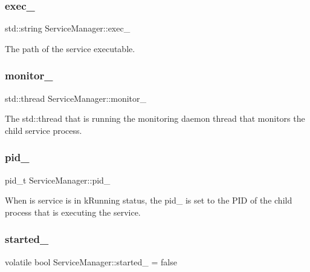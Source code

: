 \subsubsection{\texorpdfstring{exec\+\_\+}{exec\_}}
{\footnotesize\ttfamily std\+::string Service\+Manager\+::exec\+\_\+\hspace{0.3cm}{\ttfamily [private]}}

The path of the service executable. \mbox{\label{classServiceManager_af0b991a29d3e0864506998db4cc03e21}} 
\subsubsection{\texorpdfstring{monitor\+\_\+}{monitor\_}}
{\footnotesize\ttfamily std\+::thread Service\+Manager\+::monitor\+\_\+\hspace{0.3cm}{\ttfamily [private]}}

The std\+::thread that is running the monitoring daemon thread that monitors the child service process. \mbox{\label{classServiceManager_ad2b098ca3fbac9d68c55440f705665f2}} 
\subsubsection{\texorpdfstring{pid\+\_\+}{pid\_}}
{\footnotesize\ttfamily pid\+\_\+t Service\+Manager\+::pid\+\_\+\hspace{0.3cm}{\ttfamily [private]}}

When is service is in k\+Running status, the pid\+\_\+ is set to the P\+ID of the child process that is executing the service. \mbox{\label{classServiceManager_afce0c026b81fdfec606bac6ef07deb09}} 
\subsubsection{\texorpdfstring{started\+\_\+}{started\_}}
{\footnotesize\ttfamily volatile bool Service\+Manager\+::started\+\_\+ = false\hspace{0.3cm}{\ttfamily [private]}}

